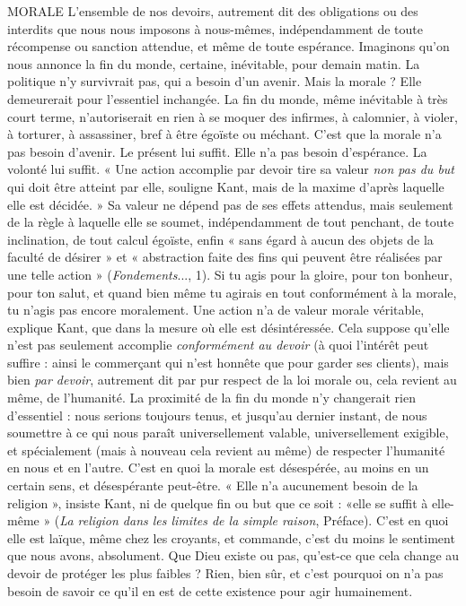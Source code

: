 MORALE L'ensemble de nos devoirs, autrement dit des obligations ou des
interdits que nous nous imposons à nous-mêmes, indépendamment
de toute récompense ou sanction attendue, et même de toute espérance.
Imaginons qu’on nous annonce la fin du monde, certaine, inévitable, pour
demain matin. La politique n’y survivrait pas, qui a besoin d’un avenir. Mais la
morale ? Elle demeurerait pour l'essentiel inchangée. La fin du monde, même
inévitable à très court terme, n’autoriserait en rien à se moquer des infirmes, à
calomnier, à violer, à torturer, à assassiner, bref à être égoïste ou méchant. C’est
que la morale n’a pas besoin d’avenir. Le présent lui suffit. Elle n’a pas besoin
d'espérance. La volonté lui suffit. « Une action accomplie par devoir tire sa
valeur {\it non pas du but} qui doit être atteint par elle, souligne Kant, mais de la
maxime d’après laquelle elle est décidée. » Sa valeur ne dépend pas de ses effets
attendus, mais seulement de la règle à laquelle elle se soumet, indépendamment
de tout penchant, de toute inclination, de tout calcul égoïste, enfin « sans égard
à aucun des objets de la faculté de désirer » et « abstraction faite des fins qui
peuvent être réalisées par une telle action » ({\it Fondements}..., 1). Si tu agis pour la
gloire, pour ton bonheur, pour ton salut, et quand bien même tu agirais en
tout conformément à la morale, tu n’agis pas encore moralement. Une action
n’a de valeur morale véritable, explique Kant, que dans la mesure où elle est
désintéressée. Cela suppose qu’elle n’est pas seulement accomplie {\it conformément
au devoir} (à quoi l'intérêt peut suffire : ainsi le commerçant qui n’est honnête
que pour garder ses clients), mais bien {\it par devoir}, autrement dit par pur respect
de la loi morale ou, cela revient au même, de l’humanité. La proximité de la fin
du monde n’y changerait rien d’essentiel : nous serions toujours tenus, et
jusqu’au dernier instant, de nous soumettre à ce qui nous paraît universellement
valable, universellement exigible, et spécialement (mais à nouveau cela
revient au même) de respecter l'humanité en nous et en l’autre. C’est en quoi
la morale est désespérée, au moins en un certain sens, et désespérante peut-être.
« Elle n’a aucunement besoin de la religion », insiste Kant, ni de quelque fin ou
but que ce soit : «elle se suffit à elle-même » ({\it La religion dans les limites de la
simple raison}, Préface). C’est en quoi elle est laïque, même chez les croyants, et
commande, c'est du moins le sentiment que nous avons, absolument. Que
Dieu existe ou pas, qu'est-ce que cela change au devoir de protéger les plus
faibles ? Rien, bien sûr, et c’est pourquoi on n’a pas besoin de savoir ce qu’il en
est de cette existence pour agir humainement.

